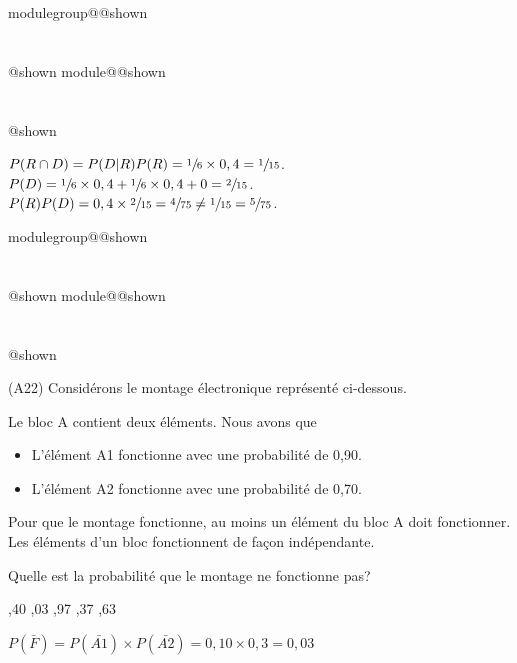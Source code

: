 \documentclass{Evaluation}
\makeatletter
\newcommand{\currentmodulekey}{}
\newcommand{\currentmoduletitle}{}
\newcommand{\currentgroupkey}{}
\newcommand{\currentgrouptitle}{}
\newcommand{\showmoduleifneeded}{%
  \ifx\currentgroupkey\empty\else
    \expandafter\ifx\csname modulegroup@\currentgroupkey @shown\endcsname\relax
      \section*{\currentgrouptitle}%
      \expandafter\gdef\csname modulegroup@\currentgroupkey @shown\endcsname{1}%
    \fi
  \fi
  \expandafter\ifx\csname module@\currentmodulekey @shown\endcsname\relax
    \section*{\currentmoduletitle}%
    \expandafter\gdef\csname module@\currentmodulekey @shown\endcsname{1}%
  \fi
}
\newenvironment{A22}{\showmoduleifneeded}{}
\newenvironment{H26}{\showmoduleifneeded}{}
\makeatother
\begin{document}
\begin{questions}
\begin{H26}
\begin{parts}
\begin{subparts}
\begin{solution}
    $P(R \cap D) = P(D|R)P(R) = \sfrac{1}{6} \times 0,4 = \sfrac{1}{15}$. $P(D) = \sfrac{1}{6}\times 0,4 + \sfrac{1}{6}\times 0,4 + 0 = \sfrac{2}{15}$. $P(R)P(D) = 0,4 \times \sfrac{2}{15} = \sfrac{4}{75} \neq \sfrac{1}{15} = \sfrac{5}{75}$.
\end{solution}
\end{subparts}
\end{parts}
\end{H26}


\begin{A22}
\question
(A22) Considérons le montage électronique représenté ci-dessous.
	
\begin{figure}[h!]
    \label{fig:montage}
    \begin{center}	 \end{center}
\vspace{-0.8cm}\end{figure}
	
 Le bloc A contient deux éléments. Nous avons que
\begin{itemize}
    \item L'élément A1 fonctionne avec une probabilité de 0,90.
    \item L'élément A2 fonctionne avec une probabilité de 0,70.
\end{itemize}
Pour que le montage fonctionne, au moins un élément du bloc A doit fonctionner. Les éléments d'un bloc fonctionnent de façon indépendante.
	
\vspace{0,3cm}

 Quelle est la probabilité que le montage ne fonctionne pas? 
	
\begin{checkboxes}
		,40
		,03
		,97
		,37
		,63
	\end{checkboxes}



\begin{solution}
$P(\bar{F})= P(\bar{A1}) \times P(\bar{A2}) = 0,10 \times 0,3 = 0,03$
\end{solution}


\end{A22}
\end{questions}
\end{document}
